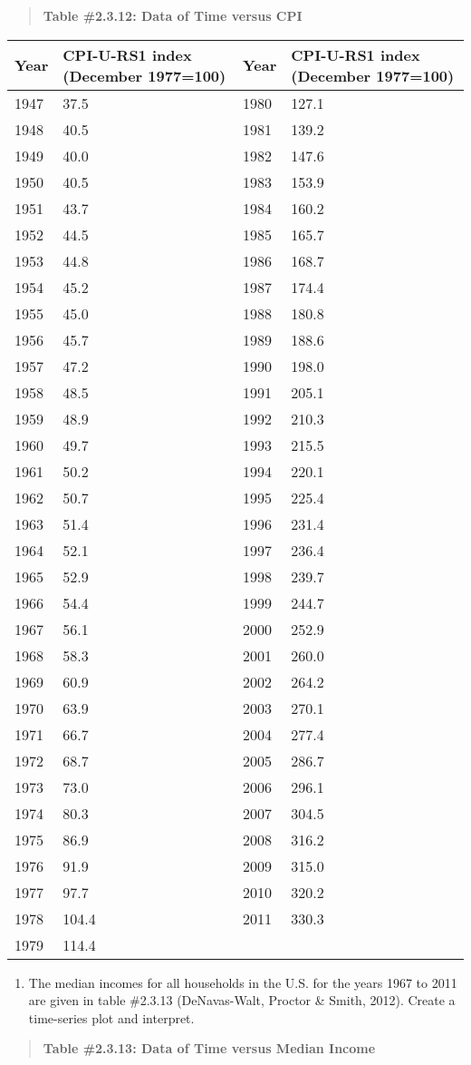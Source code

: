 \documentclass[]{book}
\providecommand{\tightlist}{%
  \setlength{\itemsep}{0pt}\setlength{\parskip}{0pt}}
\begin{document}
\begin{quote}
\textbf{Table \#2.3.12: Data of Time versus CPI}
\end{quote}

\begin{longtable}[]{@{}llll@{}}
\toprule
Year & CPI-U-RS1 index (December 1977=100) & Year & CPI-U-RS1 index (December 1977=100)\tabularnewline
\midrule
\endhead
1947 & 37.5 & 1980 & 127.1\tabularnewline
1948 & 40.5 & 1981 & 139.2\tabularnewline
1949 & 40.0 & 1982 & 147.6\tabularnewline
1950 & 40.5 & 1983 & 153.9\tabularnewline
1951 & 43.7 & 1984 & 160.2\tabularnewline
1952 & 44.5 & 1985 & 165.7\tabularnewline
1953 & 44.8 & 1986 & 168.7\tabularnewline
1954 & 45.2 & 1987 & 174.4\tabularnewline
1955 & 45.0 & 1988 & 180.8\tabularnewline
1956 & 45.7 & 1989 & 188.6\tabularnewline
1957 & 47.2 & 1990 & 198.0\tabularnewline
1958 & 48.5 & 1991 & 205.1\tabularnewline
1959 & 48.9 & 1992 & 210.3\tabularnewline
1960 & 49.7 & 1993 & 215.5\tabularnewline
1961 & 50.2 & 1994 & 220.1\tabularnewline
1962 & 50.7 & 1995 & 225.4\tabularnewline
1963 & 51.4 & 1996 & 231.4\tabularnewline
1964 & 52.1 & 1997 & 236.4\tabularnewline
1965 & 52.9 & 1998 & 239.7\tabularnewline
1966 & 54.4 & 1999 & 244.7\tabularnewline
1967 & 56.1 & 2000 & 252.9\tabularnewline
1968 & 58.3 & 2001 & 260.0\tabularnewline
1969 & 60.9 & 2002 & 264.2\tabularnewline
1970 & 63.9 & 2003 & 270.1\tabularnewline
1971 & 66.7 & 2004 & 277.4\tabularnewline
1972 & 68.7 & 2005 & 286.7\tabularnewline
1973 & 73.0 & 2006 & 296.1\tabularnewline
1974 & 80.3 & 2007 & 304.5\tabularnewline
1975 & 86.9 & 2008 & 316.2\tabularnewline
1976 & 91.9 & 2009 & 315.0\tabularnewline
1977 & 97.7 & 2010 & 320.2\tabularnewline
1978 & 104.4 & 2011 & 330.3\tabularnewline
1979 & 114.4 & &\tabularnewline
\bottomrule
\end{longtable}

\begin{enumerate}
\def\labelenumi{\arabic{enumi}.}
\setcounter{enumi}{9}
\tightlist
\item
  The median incomes for all households in the U.S. for the years 1967
  to 2011 are given in table \#2.3.13 (DeNavas-Walt, Proctor \& Smith,
  2012). Create a time-series plot and interpret.
\end{enumerate}

\begin{quote}
\textbf{Table \#2.3.13: Data of Time versus Median Income}
\end{quote}
\end{document}
